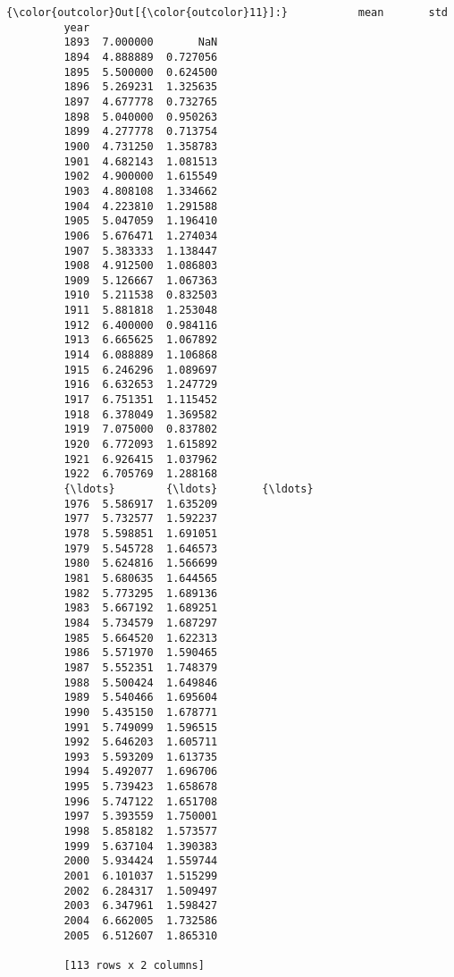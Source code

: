 \documentclass[11pt]{article}
\begin{document}
\begin{Verbatim}[commandchars=\\\{\}]
{\color{outcolor}Out[{\color{outcolor}11}]:}           mean       std
         year                    
         1893  7.000000       NaN
         1894  4.888889  0.727056
         1895  5.500000  0.624500
         1896  5.269231  1.325635
         1897  4.677778  0.732765
         1898  5.040000  0.950263
         1899  4.277778  0.713754
         1900  4.731250  1.358783
         1901  4.682143  1.081513
         1902  4.900000  1.615549
         1903  4.808108  1.334662
         1904  4.223810  1.291588
         1905  5.047059  1.196410
         1906  5.676471  1.274034
         1907  5.383333  1.138447
         1908  4.912500  1.086803
         1909  5.126667  1.067363
         1910  5.211538  0.832503
         1911  5.881818  1.253048
         1912  6.400000  0.984116
         1913  6.665625  1.067892
         1914  6.088889  1.106868
         1915  6.246296  1.089697
         1916  6.632653  1.247729
         1917  6.751351  1.115452
         1918  6.378049  1.369582
         1919  7.075000  0.837802
         1920  6.772093  1.615892
         1921  6.926415  1.037962
         1922  6.705769  1.288168
         {\ldots}        {\ldots}       {\ldots}
         1976  5.586917  1.635209
         1977  5.732577  1.592237
         1978  5.598851  1.691051
         1979  5.545728  1.646573
         1980  5.624816  1.566699
         1981  5.680635  1.644565
         1982  5.773295  1.689136
         1983  5.667192  1.689251
         1984  5.734579  1.687297
         1985  5.664520  1.622313
         1986  5.571970  1.590465
         1987  5.552351  1.748379
         1988  5.500424  1.649846
         1989  5.540466  1.695604
         1990  5.435150  1.678771
         1991  5.749099  1.596515
         1992  5.646203  1.605711
         1993  5.593209  1.613735
         1994  5.492077  1.696706
         1995  5.739423  1.658678
         1996  5.747122  1.651708
         1997  5.393559  1.750001
         1998  5.858182  1.573577
         1999  5.637104  1.390383
         2000  5.934424  1.559744
         2001  6.101037  1.515299
         2002  6.284317  1.509497
         2003  6.347961  1.598427
         2004  6.662005  1.732586
         2005  6.512607  1.865310
         
         [113 rows x 2 columns]
\end{Verbatim}
            
\end{document}
